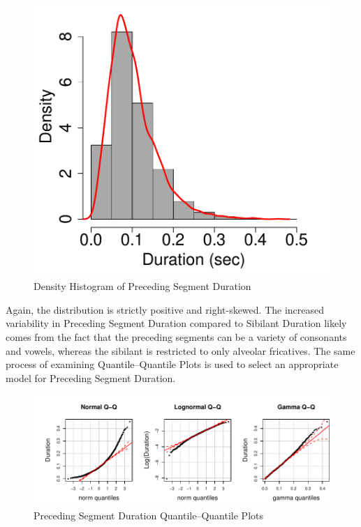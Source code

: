 \documentclass[a4paper]{article}
\begin{document}
\begin{figure}[h!]
  \begin{center}
    \begin{minipage}[t]{0.5\linewidth}
      \begin{center}
\includegraphics{prelim-030}
      \end{center}
    \end{minipage}
    \caption{Density Histogram of Preceding Segment Duration}
    \label{fig:prec_dur_hist}
  \end{center}
\end{figure}
Again, the distribution is strictly positive and right-skewed.  The
increased variability in Preceding Segment Duration compared to
Sibilant Duration likely comes from the fact that the preceding
segments can be a variety of consonants and vowels, whereas the
sibilant is restricted to only alveolar fricatives.  The same process
of examining Quantile--Quantile Plots is used to select an appropriate
model for Preceding Segment Duration.

\begin{figure}[h!]
  \begin{center}
    \begin{minipage}[t]{\linewidth}
      \begin{center}
\includegraphics{prelim-032}
      \end{center}
    \end{minipage}
    \caption{Preceding Segment Duration Quantile--Quantile Plots}
    \label{fig:prec_dur_qq}
  \end{center}
\end{figure}
\end{document}
